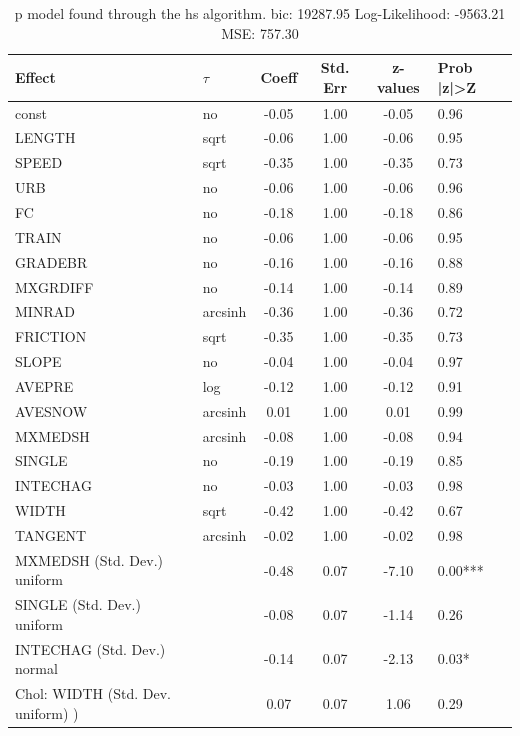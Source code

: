 \begin{table}
	\caption{p model found through the hs algorithm. bic: 19287.95 Log-Likelihood: -9563.21 MSE: 757.30}
	\begin{center}
		\begin{tabular}{|l|l|c|c|c|l|}
			\hline
			Effect & $\tau$ & Coeff & Std. Err & z-values & Prob |z|>Z \\
			\hline
			const & no & -0.05 & 1.00 & -0.05 & 0.96 \\
			\hline
			LENGTH & sqrt & -0.06 & 1.00 & -0.06 & 0.95 \\
			\hline
			SPEED & sqrt & -0.35 & 1.00 & -0.35 & 0.73 \\
			\hline
			URB & no & -0.06 & 1.00 & -0.06 & 0.96 \\
			\hline
			FC & no & -0.18 & 1.00 & -0.18 & 0.86 \\
			\hline
			TRAIN & no & -0.06 & 1.00 & -0.06 & 0.95 \\
			\hline
			GRADEBR & no & -0.16 & 1.00 & -0.16 & 0.88 \\
			\hline
			MXGRDIFF & no & -0.14 & 1.00 & -0.14 & 0.89 \\
			\hline
			MINRAD & arcsinh & -0.36 & 1.00 & -0.36 & 0.72 \\
			\hline
			FRICTION & sqrt & -0.35 & 1.00 & -0.35 & 0.73 \\
			\hline
			SLOPE & no & -0.04 & 1.00 & -0.04 & 0.97 \\
			\hline
			AVEPRE & log & -0.12 & 1.00 & -0.12 & 0.91 \\
			\hline
			AVESNOW & arcsinh & 0.01 & 1.00 & 0.01 & 0.99 \\
			\hline
			MXMEDSH & arcsinh & -0.08 & 1.00 & -0.08 & 0.94 \\
			\hline
			SINGLE & no & -0.19 & 1.00 & -0.19 & 0.85 \\
			\hline
			INTECHAG & no & -0.03 & 1.00 & -0.03 & 0.98 \\
			\hline
			WIDTH & sqrt & -0.42 & 1.00 & -0.42 & 0.67 \\
			\hline
			TANGENT & arcsinh & -0.02 & 1.00 & -0.02 & 0.98 \\
			\hline
			MXMEDSH (Std. Dev.) uniform &  & -0.48 & 0.07 & -7.10 & 0.00*** \\
			\hline
			SINGLE (Std. Dev.) uniform &  & -0.08 & 0.07 & -1.14 & 0.26 \\
			\hline
			INTECHAG (Std. Dev.) normal &  & -0.14 & 0.07 & -2.13 & 0.03* \\
			\hline
			 Chol: WIDTH (Std. Dev. uniform) ) &  & 0.07 & 0.07 & 1.06 & 0.29 \\

\end{tabular}
\end{center}
\end{table}
